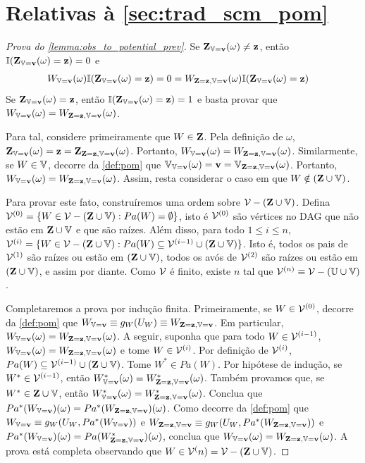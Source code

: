 \section{Relativas à \cref{sec:trad_scm_pom}}

\begin{proof}[Prova do \cref{lemma:obs_to_potential_prev}]
 Se $\Z_{\V=\bv}(\omega) \neq \bz$, então
 $\I(\Z_{\V=\bv}(\omega) = \bz) = 0$ e
 \begin{align*}
  W_{\V=\bv}(\omega) \I(\Z_{\V=\bv}(\omega) = \bz)
  &= 0 = W_{\Z = \bz, \V=\bv}(\omega) 
  \I(\Z_{\V=\bv}(\omega) = \bz)
 \end{align*}
 Se $\Z_{\V=\bv}(\omega) = \bz$, então
 $\I(\Z_{\V=\bv}(\omega) = \bz) = 1$ e
 basta provar que
 $W_{\V=\bv}(\omega) = W_{\Z = \bz, \V=\bv}(\omega)$.

 Para tal, considere primeiramente que $W \in \Z$.
 Pela definição de $\omega$, 
 $\Z_{\V=\bv}(\omega) = \bz = \Z_{\Z = \bz, \V=\bv}(\omega)$.
 Portanto, $W_{\V=\bv}(\omega) = W_{\Z = \bz, \V=\bv}(\omega)$.
 Similarmente, se $W \in \V$, decorre da \cref{def:pom} que
 $\V_{\V=\bv}(\omega) = \bv =\V_{\Z = \bz, \V=\bv}(\omega)$.
 Portanto, $W_{\V=\bv}(\omega) = W_{\Z = \bz, \V=\bv}(\omega)$.
 Assim, resta considerar o caso em que
 $W \notin (\Z \cup \V)$.
 
 Para provar este fato,
 construíremos uma ordem sobre $\sV-(\Z \cup \V)$.
 Defina $\sV^{(0)} = \{W \in \sV-(\Z \cup \V): Pa(W) = \emptyset\}$,
 isto é $\sV^{(0)}$ são vértices no DAG que 
 não estão em $\Z \cup \V$ e que são raízes.
 Além disso, para todo $1 \leq i \leq n$,
 $\sV^{(i)} = \{W \in \sV-(\Z \cup \V): 
 Pa(W) \subseteq \sV^{(i-1)} \cup (\Z \cup \V)\}$.
 Isto é, todos os pais de $\sV^{(1)}$ são raízes
 ou estão em $(\Z \cup \V)$,
 todos os avós de $\sV^{(2)}$ 
 são raízes ou estão em $(\Z \cup \V)$, e assim por diante.
 Como $\sV$ é finito, existe $n$ tal que
 $\sV^{(n)} \equiv \sV-(\U \cup \V)$.
 
 Completaremos a prova por indução finita.
 Primeiramente, se $W \in \sV^{(0)}$,
 decorre da \cref{def:pom} que
 $W_{\V=\bv} \equiv g_W(U_W) \equiv W_{\Z=\bz,\V=\bv}$.
 Em particular,
 $W_{\V=\bv}(\omega) = W_{\Z=\bz,\V=\bv}(\omega)$.
 A seguir, suponha que 
 para todo $W \in \sV^{(i-1)}$,
 $W_{\V=\bv}(\omega) =  W_{\Z=\bz,\V=\bv}(\omega)$ e
 tome $W \in \sV^{(i)}$.
 Por definição de $\sV^{(i)}$, 
 $Pa(W) \subseteq \sV^{(i-1)} \cup (\Z \cup \V)$.
 Tome $W^* \in Pa(W)$.
 Por hipótese de indução,
 se $W^* \in \sV^{(i-1)}$, então
 $W^*_{\V=\bv}(\omega) =  W^*_{\Z=\bz,\V=\bv}(\omega)$.
 Também provamos que, se $W^* \in \Z \cup \V$, então
 $W^*_{\V=\bv}(\omega) =  W^*_{\Z=\bz,\V=\bv}(\omega)$.
 Conclua que 
 $Pa^*(W_{\V=\bv})(\omega) = Pa^*(W_{\Z=\bz,\V=\bv})(\omega)$.
 Como decorre da \cref{def:pom} que
 $W_{\V=\bv} \equiv g_W(U_W, Pa^*(W_{\V=\bv}))$ e
 $W_{\Z=\bz,\V=\bv} \equiv g_W(U_W, Pa^*(W_{\Z=\bz,\V=\bv}))$ e
 $Pa^*(W_{\V=\bv})(\omega) = Pa(W^*_{\Z=\bz,\V=\bv})(\omega)$,
 conclua que
 $W_{\V=\bv}(\omega) = W_{\Z=\bz,\V=\bv}(\omega)$.
 A prova está completa observando que
 $W \in \sV^(n) = \sV - (\Z \cup \V)$.
\end{proof}

